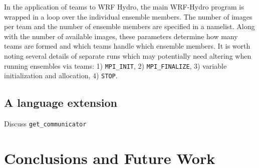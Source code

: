 In the application of teams to WRF Hydro, the main WRF-Hydro program is wrapped in a loop
over the individual ensemble members. The number of images per team and the
 number of ensemble members are specified in a namelist. Along with
 the number of available images, these parameters determine how many
 teams are formed and which teams handle which ensemble members. It is
 worth noting several details of separate runs which may potentially need altering
 when running ensembles via teams: 1) \texttt{MPI\_INIT}, 2) \texttt{MPI\_FINALIZE}, 3)
 variable initialization and allocation, 4) \texttt{STOP}.

\subsection{A language extension}
Discuss \lstinline|get_communicator|

\section{Conclusions and Future Work}\label{sec:conclusions}




